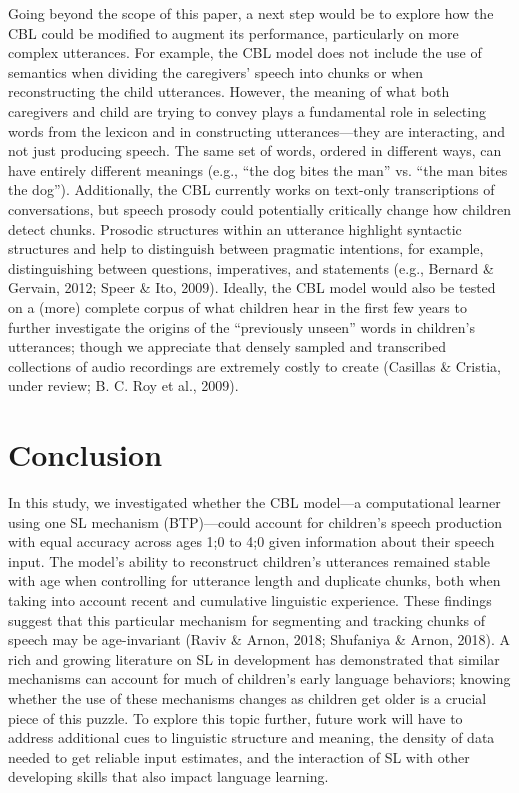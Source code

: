 \documentclass[man,mask,floatsintext]{apa6}
\begin{document}
Going beyond the scope of this paper, a next step would be to explore
how the CBL could be modified to augment its performance, particularly
on more complex utterances. For example, the CBL model does not include
the use of semantics when dividing the caregivers' speech into chunks or
when reconstructing the child utterances. However, the meaning of what
both caregivers and child are trying to convey plays a fundamental role
in selecting words from the lexicon and in constructing
utterances---they are interacting, and not just producing speech. The
same set of words, ordered in different ways, can have entirely
different meanings (e.g., \enquote{the dog bites the man} vs.
\enquote{the man bites the dog}). Additionally, the CBL currently works
on text-only transcriptions of conversations, but speech prosody could
potentially critically change how children detect chunks. Prosodic
structures within an utterance highlight syntactic structures and help
to distinguish between pragmatic intentions, for example, distinguishing
between questions, imperatives, and statements (e.g., Bernard \&
Gervain, 2012; Speer \& Ito, 2009). Ideally, the CBL model would also be
tested on a (more) complete corpus of what children hear in the first
few years to further investigate the origins of the \enquote{previously
unseen} words in children's utterances; though we appreciate that
densely sampled and transcribed collections of audio recordings are
extremely costly to create (Casillas \& Cristia, under review; B. C. Roy
et al., 2009).

\section{Conclusion}\label{conclusion}

In this study, we investigated whether the CBL model---a computational
learner using one SL mechanism (BTP)---could account for children's
speech production with equal accuracy across ages 1;0 to 4;0 given
information about their speech input. The model's ability to reconstruct
children's utterances remained stable with age when controlling for
utterance length and duplicate chunks, both when taking into account
recent and cumulative linguistic experience. These findings suggest that
this particular mechanism for segmenting and tracking chunks of speech
may be age-invariant (Raviv \& Arnon, 2018; Shufaniya \& Arnon, 2018). A
rich and growing literature on SL in development has demonstrated that
similar mechanisms can account for much of children's early language
behaviors; knowing whether the use of these mechanisms changes as
children get older is a crucial piece of this puzzle. To explore this
topic further, future work will have to address additional cues to
linguistic structure and meaning, the density of data needed to get
reliable input estimates, and the interaction of SL with other
developing skills that also impact language learning.
\end{document}
